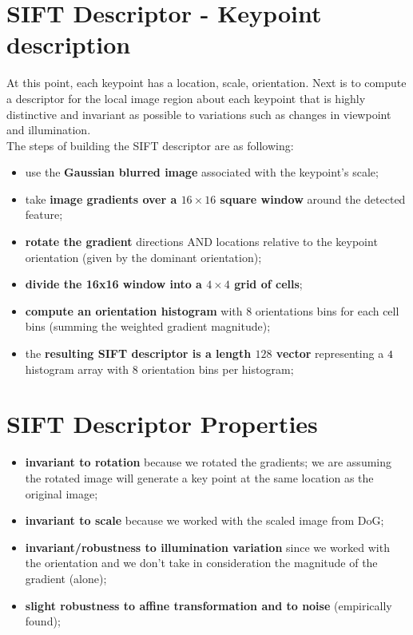 \documentclass{article}
\begin{document}
\section*{SIFT Descriptor - Keypoint description}

At this point, each keypoint has a location, scale, orientation. Next is to compute a descriptor for the local image region about each keypoint that is highly distinctive and invariant as possible to variations such as changes in viewpoint and illumination. \\

The steps of building the SIFT descriptor are as following:

\begin{itemize}
    \item use the \textbf{Gaussian blurred image} associated with the keypoint's scale;
    \item take \textbf{image gradients over a $16\times16$ square window} around the detected feature;
    \item \textbf{rotate the gradient} directions AND locations relative to the keypoint orientation (given by the dominant orientation);
    \item \textbf{divide the 16x16 window into a $4\times4$ grid of cells};
    \item \textbf{compute an orientation histogram} with $8$ orientations bins for each cell bins (summing the weighted gradient magnitude);
    \item the \textbf{resulting SIFT descriptor is a length $128$ vector} representing a $4\time4$ histogram array with $8$ orientation bins per histogram;
\end{itemize}

\newpage

\section*{SIFT Descriptor Properties}

\begin{itemize}
    \item \textbf{invariant to rotation} because we rotated the gradients; we are assuming the rotated image will generate a key point at the same location as the original image;
    \item \textbf{invariant to scale} because we worked with the scaled image from DoG;
    \item \textbf{invariant/robustness to illumination variation} since we worked with the orientation and we don’t take in consideration the magnitude of the gradient (alone);
    \item \textbf{slight robustness to affine transformation and to noise} (empirically found);
\end{itemize}
\end{document}
